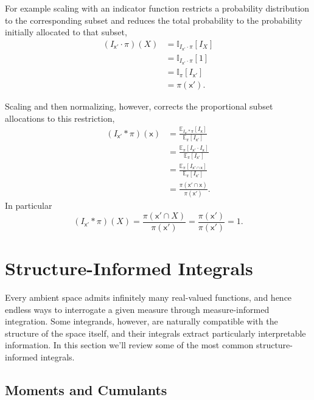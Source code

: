 \documentclass[
  letterpaper,
  DIV=11,
  numbers=noendperiod]{scrartcl}
\begin{document}
For example scaling with an indicator function restricts a probability
distribution to the corresponding subset and reduces the total
probability to the probability initially allocated to that subset,
\begin{align*}
(I_{\mathsf{x}'} \cdot \pi)(X)
&=
\mathbb{I}_{I_{\mathsf{x}'} \cdot \pi} [ I_{X} ]
\\
&=
\mathbb{I}_{I_{\mathsf{x}'} \cdot \pi} [ 1 ]
\\
&=
\mathbb{I}_{\pi} [ I_{\mathsf{x}'} ]
\\
&=
\pi(\mathsf{x}').
\end{align*}

Scaling and then normalizing, however, corrects the proportional subset
allocations to this restriction, \begin{align*}
(I_{\mathsf{x}'} \ast \pi)( \mathsf{x} )
&=
\frac{ \mathbb{E}_{I_{\mathsf{x}'} \ast \pi} [ I_{\mathsf{x}} ] }
{ \mathbb{E}_{\pi} [ I_{\mathsf{x}'} ] }
\\
&=
\frac{ \mathbb{E}_{\pi} [ I_{\mathsf{x}'} \cdot I_{\mathsf{x}} ] }
{ \mathbb{E}_{\pi} [ I_{\mathsf{x}'} ] }
\\
&=
\frac{ \mathbb{E}_{\pi} [ I_{\mathsf{x}' \cap \mathsf{x}} ] }
{ \mathbb{E}_{\pi} [ I_{\mathsf{x}'} ] }
\\
&=
\frac{ \pi(\mathsf{x}' \cap \mathsf{x}) }
{ \pi(\mathsf{x}') }.
\end{align*} In particular \[
(I_{\mathsf{x}'} \ast \pi)( X )
=
\frac{ \pi(\mathsf{x}' \cap X) }{ \pi(\mathsf{x}') }
=
\frac{ \pi(\mathsf{x}') }{ \pi(\mathsf{x}') }
=
1.
\]

\hypertarget{structure-informed-integrals}{%
\section{Structure-Informed
Integrals}\label{structure-informed-integrals}}

Every ambient space admits infinitely many real-valued functions, and
hence endless ways to interrogate a given measure through
measure-informed integration. Some integrands, however, are naturally
compatible with the structure of the space itself, and their integrals
extract particularly interpretable information. In this section we'll
review some of the most common structure-informed integrals.

\hypertarget{moments-and-cumulants}{%
\subsection{Moments and Cumulants}\label{moments-and-cumulants}}
\end{document}
